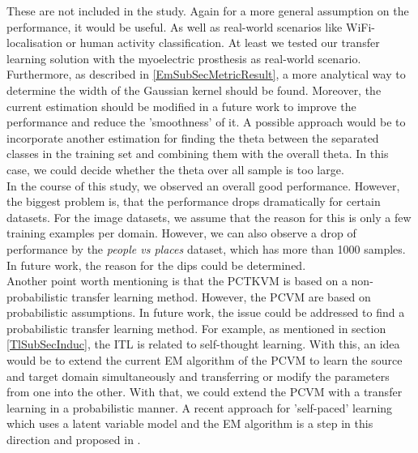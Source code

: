 These are not included in the study. Again for a more general assumption on the performance, it would be useful.
As well as real-world scenarios like WiFi-localisation or human activity classification.\cite[p. 32]{Weiss.2016}
At least we tested our transfer learning solution with the myoelectric prosthesis as real-world scenario.\\
Furthermore, as described in \ref{EmSubSecMetricResult}, a more analytical way to determine the width of the Gaussian kernel should be found. Moreover, the current estimation should be modified in a future work to improve the performance and reduce the 'smoothness' of it.
A possible approach would be to incorporate another estimation for finding the theta between the separated classes in the training set and combining them with the overall theta. In this case, we could decide whether the theta over all sample is too large.\\
In the course of this study, we observed an overall good performance. However, the biggest problem is, that the performance drops dramatically for certain datasets. For the image datasets, we assume that the reason for this is only a few training examples per domain. However, we can also observe a drop of performance by the \textit{people vs places} dataset, which has more than 1000 samples.
In future work, the reason for the dips could be determined.\\
Another point worth mentioning is that the \acs{PCTKVM} is based on a non-probabilistic transfer learning method. 
However, the \acs{PCVM} are based on probabilistic assumptions.
In future work, the issue could be addressed to find a probabilistic transfer learning method.
For example, as mentioned in section \ref{TlSubSecInduc}, the \acl{ITL} is related to self-thought learning.
With this, an idea would be to extend the current \acs{EM} algorithm of the \acs{PCVM} to learn the source and target domain simultaneously and transferring or modify the parameters from one into the other.
With that, we could extend the \acs{PCVM} with a transfer learning in a probabilistic manner.
A recent approach for 'self-paced' learning which uses a latent variable model and the \acs{EM} algorithm is a step in this direction and proposed in \cite{Kumar.2010}.